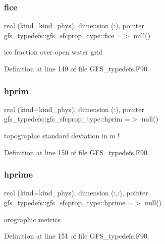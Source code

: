 \subsubsection{fice}
{\footnotesize\ttfamily real (kind=kind\+\_\+phys), dimension   (\+:), pointer gfs\+\_\+typedefs\+::gfs\+\_\+sfcprop\+\_\+type\+::fice =$>$ null()}



ice fraction over open water grid 



Definition at line 149 of file G\+F\+S\+\_\+typedefs.\+F90.

\mbox{\label{structgfs__typedefs_1_1gfs__sfcprop__type_af38c966f64917b926a2ccfaa8905ac45}} 
\subsubsection{hprim}
{\footnotesize\ttfamily real (kind=kind\+\_\+phys), dimension  (\+:), pointer gfs\+\_\+typedefs\+::gfs\+\_\+sfcprop\+\_\+type\+::hprim =$>$ null()}



topographic standard deviation in m ! 



Definition at line 150 of file G\+F\+S\+\_\+typedefs.\+F90.

\mbox{\label{structgfs__typedefs_1_1gfs__sfcprop__type_af02618f00e6fc13411da430e6865fcc2}} 
\subsubsection{hprime}
{\footnotesize\ttfamily real (kind=kind\+\_\+phys), dimension (\+:,\+:), pointer gfs\+\_\+typedefs\+::gfs\+\_\+sfcprop\+\_\+type\+::hprime =$>$ null()}



orographic metrics 



Definition at line 151 of file G\+F\+S\+\_\+typedefs.\+F90.

\mbox{\label{structgfs__typedefs_1_1gfs__sfcprop__type_a69ee85612535bcb59e5e6dd3f45031ef}} 
